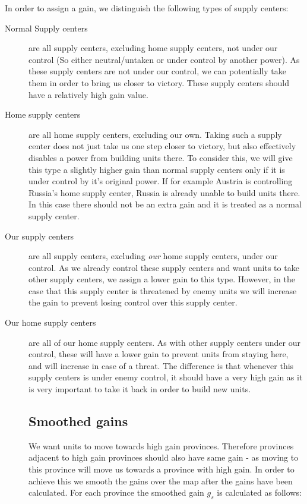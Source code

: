 \documentclass[a4paper]{article} %
\begin{document}
In order to assign a gain, we distinguish the following types of supply centers: 

\begin{description} 

\item[Normal Supply centers]
are all supply centers, excluding home supply centers, not under our control (So either neutral/untaken or under control by another power). As these supply centers are not under our control, we can potentially take them in order to bring us closer to victory. These supply centers should have a relatively high gain value. 

\item[Home supply centers]
are all home supply centers, excluding our own. Taking such a supply center does not just take us one step closer to victory, but also effectively disables a power from building units there. To consider this, we will give this type a slightly higher gain than normal supply centers only if it is under control by it's original power. If for example Austria is controlling Russia's home supply center, Russia is already unable to build units there. In this case there should not be an extra gain and it is treated as a normal supply center.    

\item[Our supply centers] are all supply centers, excluding \textit{our} home supply centers, under our control. As we already control these supply centers and want units to take other supply centers, we assign a lower gain to this type. However, in the case that this supply center is threatened by enemy units we will increase the gain to prevent losing control over this supply center.  

\item[Our home supply centers] are all of our home supply centers. As with other supply centers under our control, these will have a lower gain to prevent units from staying here, and will increase in case of a threat. The difference is that whenever this supply centers is under enemy control, it should have a very high gain as it is very important to take it back in order to build new units.   

\subsection{Smoothed gains}
We want units to move towards high gain provinces. Therefore provinces adjacent to high gain provinces should also have same gain - as moving to this province will move us towards a province with high gain. In order to achieve this we smooth the gains over the map after the gains have been calculated. For each province the smoothed gain $g_s$ is calculated as follows:


\end{description}
\end{document}

